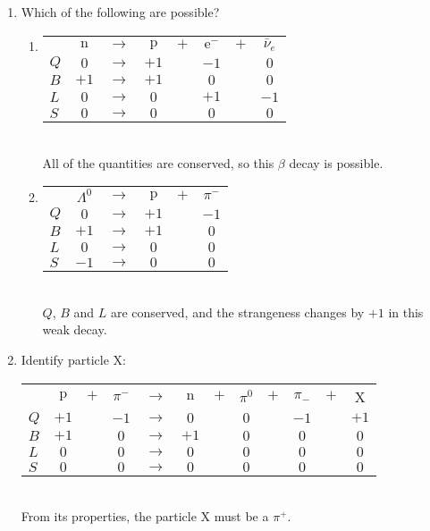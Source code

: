 \documentclass[a4paper,12pt]{article}
\begin{document}
\begin{enumerate}
\item Which of the following are possible?\begin{enumerate}
\item \begin{tabular}[t]{lccccccc}
& $\mathrm{n}$ & $\longrightarrow$ & $\mathrm{p}$ & $+$ & $\mathrm{e}^{-}$ & $+$ & $\bar{\nu}_{e}$\\
$Q$ & $0$ & $\rightarrow$ & $+1$ & & $-1$ & & $0$ \\
$B$ & $+1$ & $\rightarrow$ & $+1$ & & $0$ & & $0$ \\
$L$ & $0$ & $\rightarrow$ & $0$ & & $+1$ & & $-1$ \\
$S$ & $0$ & $\rightarrow$ & $0$ & & $0$ & & $0$ \\
\end{tabular}\\
All of the quantities are conserved, so this $\beta$ decay is possible.
\item \begin{tabular}[t]{lccccc}
& $\Lambda^{0}$ & $\longrightarrow$ & $\mathrm{p}$ & $+$ & $\pi^{-}$ \\
$Q$ & $0$ & $\rightarrow$ & $+1$ & & $-1$ \\
$B$ & $+1$ & $\rightarrow$ & $+1$ & & $0$  \\
$L$ & $0$ & $\rightarrow$ & $0$ & & $0$  \\
$S$ & $-1$ & $\rightarrow$ & $0$ & & $0$ \\
\end{tabular}\\
$Q$, $B$ and $L$ are conserved, and the strangeness changes by $+1$ in this weak decay.
\end{enumerate}
\item Identify particle X:\\
\begin{tabular}[t]{lccccccccccc}
& $\mathrm{p}$ & $+$ & $\pi^{-}$ & $\longrightarrow$ & $\mathrm{n}$ & $+$ & $\pi^{0}$ & $+$ & $\pi_{-}$ & $+$ & X\\
$Q$ & $+1$ & & $-1$ & $\rightarrow$ & $0$ & & $0$ & & $-1$ & & $+1$ \\
$B$ & $+1$ & & $0$ & $\rightarrow$ & $+1$ & & $0$ & & $0$ & & $0$ \\
$L$ & $0$ & & $0$ & $\rightarrow$ & $0$ & & $0$ & & $0$ & & $0$ \\
$S$ & $0$ & & $0$ & $\rightarrow$ & $0$ & & $0$ & & $0$ & & $0$ \\
\end{tabular}\\
From its properties, the particle X must be a $\pi^{+}$.
\end{enumerate}
\end{document}
